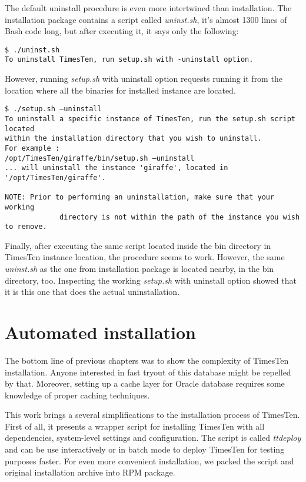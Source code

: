 \documentclass[11pt, letterpaper]{article}
\begin{document}
The default uninstall procedure is even more intertwined than installation. The installation package contains a script called \emph{uninst.sh}, it’s almost 1300 lines of Bash code long, but after executing it, it says only the following:

\begin{lstlisting}
$ ./uninst.sh
To uninstall TimesTen, run setup.sh with -uninstall option.
\end{lstlisting}

However, running \emph{setup.sh} with uninstall option requests running it from the location where all the binaries for installed instance are located.

\begin{lstlisting}
$ ./setup.sh –uninstall
To uninstall a specific instance of TimesTen, run the setup.sh script located
within the installation directory that you wish to uninstall.
For example :
/opt/TimesTen/giraffe/bin/setup.sh –uninstall
... will uninstall the instance 'giraffe', located in '/opt/TimesTen/giraffe'.

NOTE: Prior to performing an uninstallation, make sure that your working
             directory is not within the path of the instance you wish to remove.

\end{lstlisting}
 
Finally, after executing the same script located inside the bin directory in TimesTen instance location, the procedure seems to work. However, the same \emph{uninst.sh} as the one from installation package is located nearby, in the bin directory, too. Inspecting the working \emph{setup.sh} with uninstall option showed that it is this one that does the actual uninstallation.


\section{Automated installation}

The bottom line of previous chapters was to show the complexity of TimesTen installation. Anyone interested in fast tryout of this database might be repelled by that. Moreover, setting up a cache layer for Oracle database requires some knowledge of proper caching techniques.

This work brings a several simplifications to the installation process of TimesTen. First of all, it presents a wrapper script for installing TimesTen with all dependencies, system-level settings and configuration. The script is called \emph{ttdeploy} and can be use interactively or in batch mode to deploy TimesTen for testing purposes faster. For even more convenient installation, we packed the script and original installation archive into RPM package.
\end{document}
